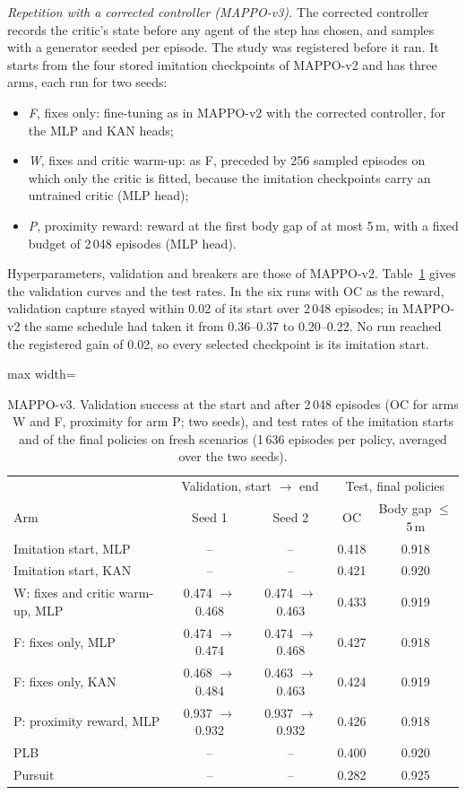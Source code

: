 \documentclass[preprint,12pt]{elsarticle}
\begin{document}
\emph{Repetition with a corrected controller (MAPPO-v3).} The corrected controller records the critic's state
before any agent of the step has chosen, and samples with a generator seeded per episode. The study was registered
before it ran. It starts from the four stored imitation checkpoints of MAPPO-v2 and has three arms, each run for two
seeds:
\begin{itemize}
\item \emph{F}, fixes only: fine-tuning as in MAPPO-v2 with the corrected controller, for the MLP and KAN heads;
\item \emph{W}, fixes and critic warm-up: as F, preceded by 256 sampled episodes on which only the critic is fitted,
because the imitation checkpoints carry an untrained critic (MLP head);
\item \emph{P}, proximity reward: reward at the first body gap of at most 5\,m, with a fixed budget of 2\,048 episodes
(MLP head).
\end{itemize}
Hyperparameters, validation and breakers are those of MAPPO-v2. Table~\ref{tab:s-v3} gives the validation curves and
the test rates. In the six runs with OC as the reward, validation capture stayed within 0.02 of its start over
2\,048 episodes; in MAPPO-v2 the same schedule had taken it from 0.36--0.37 to 0.20--0.22. No run reached the
registered gain of 0.02, so every selected checkpoint is its imitation start.

\begin{table}[!h]
\centering
\caption{MAPPO-v3. Validation success at the start and after 2\,048 episodes (OC for arms W and F, proximity for arm
P; two seeds), and test rates of the imitation starts and of the final policies on fresh scenarios (1\,636 episodes
per policy, averaged over the two seeds).}
\label{tab:s-v3}
\begin{adjustbox}{max width=\textwidth}
\begin{tabular}{@{}lcccc@{}}
\toprule
& \multicolumn{2}{c}{Validation, start $\to$ end} & \multicolumn{2}{c}{Test, final policies} \\
Arm & Seed 1 & Seed 2 & OC & Body gap $\le$5\,m \\
\midrule
Imitation start, MLP & -- & -- & 0.418 & 0.918 \\
Imitation start, KAN & -- & -- & 0.421 & 0.920 \\
W: fixes and critic warm-up, MLP & 0.474 $\to$ 0.468 & 0.474 $\to$ 0.463 & 0.433 & 0.919 \\
F: fixes only, MLP & 0.474 $\to$ 0.474 & 0.474 $\to$ 0.468 & 0.427 & 0.918 \\
F: fixes only, KAN & 0.468 $\to$ 0.484 & 0.463 $\to$ 0.463 & 0.424 & 0.919 \\
P: proximity reward, MLP & 0.937 $\to$ 0.932 & 0.937 $\to$ 0.932 & 0.426 & 0.918 \\
\midrule
PLB & -- & -- & 0.400 & 0.920 \\
Pursuit & -- & -- & 0.282 & 0.925 \\
\bottomrule
\end{tabular}
\end{adjustbox}
\end{table}
\end{document}
